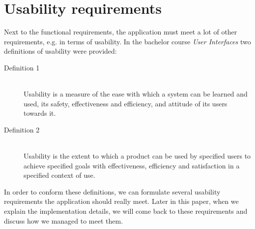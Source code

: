 \section{Usability requirements}\label{sec:usability-requirements}
Next to the functional requirements, the application must meet a lot of other requirements, e.g. in terms of usability. In the bachelor course \textit{User Interfaces} \citep{ui_course_detroyer} two definitions of usability were provided:

\begin{description}
	\item[Definition 1] \hfill \\
	Usability is a measure of the ease with which a system can be learned and used, its safety, effectiveness and efficiency, and attitude of its users towards it.

	\item[Definition 2] \hfill \\
	Usability is the extent to which a product can be used by specified users to achieve specified goals with effectiveness, efficiency and satisfaction in a specified context of use.
\end{description}

In order to conform these definitions, we can formulate several usability requirements the application should really meet. Later in this paper, when we explain the implementation details, we will come back to these requirements and discuss how we managed to meet them.

